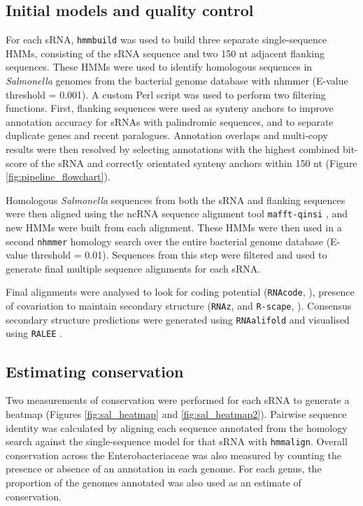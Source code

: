 \subsection{Initial models and quality control}

For each sRNA, \texttt{hmmbuild} \citep{Wheeler2013-qxxw} was used to build three separate single-sequence HMMs, consisting of the sRNA sequence and two 150 nt adjacent flanking sequences. These HMMs were used to identify homologous sequences in \textit{Salmonella} genomes from the bacterial genome database with nhmmer (E-value threshold = 0.001). A custom Perl script was used to perform two filtering functions. First, flanking sequences were used as synteny anchors to improve annotation accuracy for sRNAs with palindromic sequences, and to separate duplicate genes and recent paralogues. Annotation overlaps and multi-copy results were then resolved by selecting annotations with the highest combined bit-score of the sRNA and correctly orientated synteny anchors within 150 nt (Figure \ref{fig:pipeline_flowchart}).

Homologous \textit{Salmonella} sequences from both the sRNA and flanking sequences were then aligned using the ncRNA sequence alignment tool \texttt{mafft-qinsi} \citep{Katoh2013-wd}, and new HMMs were built from each alignment. These HMMs were then used in a second \texttt{nhmmer} \citep{Wheeler2013-qxxw} homology search over the entire bacterial genome database (E-value threshold = 0.01). Sequences from this step were filtered and used to generate final multiple sequence alignments for each sRNA. 

Final alignments were analysed to look for coding potential (\texttt{RNAcode}, \cite{Washietl2011-oz}), presence of covariation to maintain secondary structure (\texttt{RNAz}, \cite{Gruber2010-ny} and \texttt{R-scape}, \cite{Rivas2017-xxx}). Consensus secondary structure predictions were generated using \texttt{RNAalifold} and visualised using \texttt{RALEE} \citep{Griffiths2005-jojo}.
\subsection{Estimating conservation}

Two measurements of conservation were performed for each sRNA to generate a heatmap (Figures \ref{fig:sal_heatmap} and \ref{fig:sal_heatmap2}). Pairwise sequence identity was calculated by aligning each sequence annotated from the homology search against the single-sequence model for that sRNA with \texttt{hmmalign}. Overall conservation across the Enterobacteriaceae was also measured by counting the presence or absence of an annotation in each genome. For each genus, the proportion of the genomes annotated was also used as an estimate of conservation. 


